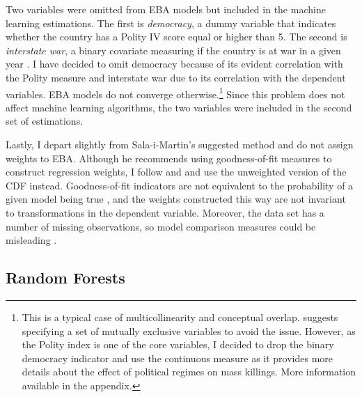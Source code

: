 \documentclass[a4paper,12pt]{article}
\begin{document}
Two variables were omitted from EBA models but included in the machine learning estimations. The first is \textit{democracy}, a dummy variable that indicates whether the country has a Polity IV score equal or higher than 5. The second is \textit{interstate war}, a binary covariate measuring if the country is at war in a given year \citep{sarkees2010resort}. I have decided to omit democracy because of its evident correlation with the Polity measure and interstate war due to its correlation with the dependent variables. EBA models do not converge otherwise.\footnote{This is a typical case of multicollinearity and conceptual overlap. \citet{hlavac2016eba} suggests specifying a set of mutually exclusive variables to avoid the issue. However, as the Polity index is one of the core variables, I decided to drop the binary democracy indicator and use the continuous measure as it provides more details about the effect of political regimes on mass killings. More information available in the appendix.}  Since this problem does not affect machine learning algorithms, the two variables were included in the second set of estimations.
	
Lastly, I depart slightly from Sala-i-Martin's suggested method and do not assign weights to EBA. Although he recommends using goodness-of-fit measures to construct regression weights, I follow \citet{sturm2002robust} and \citet[299]{gassebner2016expect} and use the unweighted version of the CDF instead. Goodness-of-fit indicators are not equivalent to the probability of a given model being true \citep{anscombe1973graphs,king1986not}, and the weights constructed this way are not invariant to transformations in the dependent variable. Moreover, the data set has a number of missing observations, so model comparison measures could be misleading \citep{lall2016multiple}.
	
\subsection{Random Forests}
\label{sub:drf}
\end{document}
